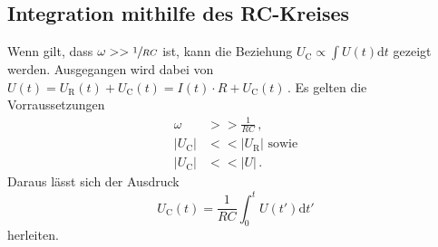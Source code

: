 \subsection{Integration mithilfe des RC-Kreises}
Wenn gilt, dass $\omega >>\sfrac{1}{RC}$ ist, kann die Beziehung
$U_\text{C}\propto\int U(t)\text{d}t$ gezeigt werden. Ausgegangen wird dabei von
$U(t)=U_\text{R}(t)+U_\text{C}(t)=I(t)\cdot R+U_\text{C}(t)$\,.
Es gelten die Vorraussetzungen
\begin{align*}
    \omega &>>\frac{1}{RC}\,,\\
    |U_\text{C}|&<<|U_\text{R}|\text{ sowie}\\
    |U_\text{C}|&<<|U|\,.
\end{align*}
Daraus lässt sich der Ausdruck
\begin{equation}
    U_\text{C}(t)=\frac{1}{RC}\int_0^t U(t')\text{d}t'
    \label{eq:integrator}
\end{equation}
herleiten.